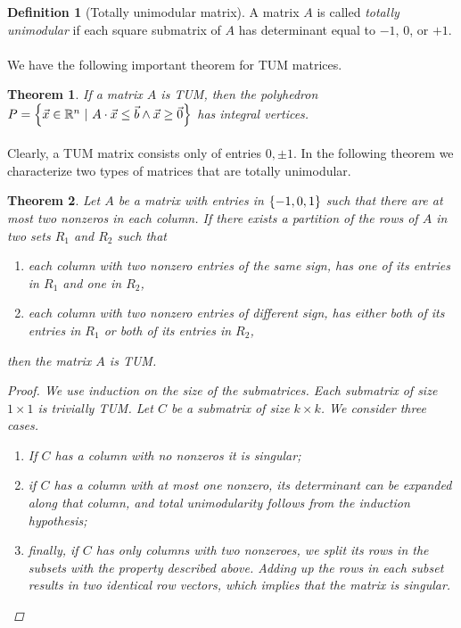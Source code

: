 \documentclass[titlepage]{book}
\theoremstyle{plain}
\newtheorem{theorem}{Theorem}[chapter]
\theoremstyle{definition}
\newtheorem{definition}{Definition}[chapter]
\theoremstyle{remark}
\begin{document}
\begin{definition}[Totally unimodular matrix]
A matrix $A$ is called \emph{totally unimodular} if each square submatrix of $A$ has determinant equal to $-1$, $0$, or $+1$.
\end{definition}

\paragraph{}
We have the following important theorem for TUM matrices.

\begin{theorem}
If a matrix $A$ is TUM, then the polyhedron $P=\left\{ \vec{x}\in\mathbb{R}^n\ |\ A\cdot\vec{x}\leq\vec{b}\wedge\vec{x}\geq\vec{0} \right\}$ has integral vertices.
\end{theorem}

\paragraph{}
Clearly, a TUM matrix consists only of entries $0,\pm 1$. In the following theorem we characterize two types of matrices that are totally unimodular.
\begin{theorem}
Let $A$ be a matrix with entries in $\left\{ -1, 0, 1 \right\}$ such that there are at most two nonzeros in each column. If there exists a partition of the rows of $A$ in two sets $R_1$ and $R_2$ such that
\begin{enumerate}
 \item each column with two nonzero entries of the same sign, has one of its entries in $R_1$ and one in $R_2$,
 \item each column with two nonzero entries of different sign, has either both of its entries in $R_1$ or both of its entries in $R_2$,
\end{enumerate}
then the matrix $A$ is TUM.
\begin{proof}
We use induction on the size of the submatrices. Each submatrix of size $1\times 1$ is trivially TUM. Let $C$ be a submatrix of size $k\times k$. We consider three cases.
\begin{enumerate}
 \item If $C$ has a column with no nonzeros it is singular;
 \item if $C$ has a column with at most one nonzero, its determinant can be expanded along that column, and total unimodularity follows from the induction hypothesis;
 \item finally, if $C$ has only columns with two nonzeroes, we split its rows in the subsets with the property described above. Adding up the rows in each subset results in two identical row vectors, which implies that the matrix is singular.
\end{enumerate}
\end{proof}
\end{theorem}
\end{document}
